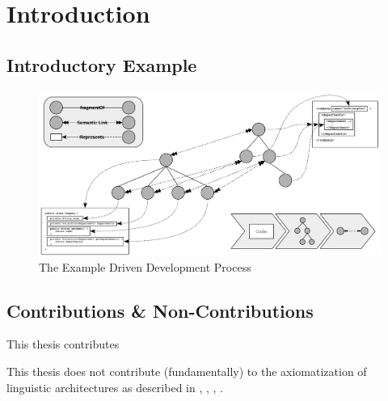 \chapter{Introduction}
\label{chapter:Introduction}


\section{Introductory Example}
\label{section:IntroductoryExample}

\begin{figure}[h!]
\begin{center}
\includegraphics[width=\textwidth]{images/RecoveryExample.png}
\end{center}
\caption{The Example Driven Development Process}
\label{figure:RecoveryExample}
\end{figure}

\section{Contributions \& Non-Contributions}
\label{section:ContributionsAndNonContributions}

\begin{contributions}

\item
This thesis contributes 

\item

\end{contributions}

\begin{noncontributions}

\item
This thesis does not contribute (fundamentally) to the axiomatization of linguistic architectures as described in \cite{DBLP:conf/ecmdafa/LammelV14}, \cite{DBLP:journals/entcs/FavreN05}, \cite{DBLP:conf/sle/Lammel16}, \cite{HeinzLV17}.

\item

\end{noncontributions}

